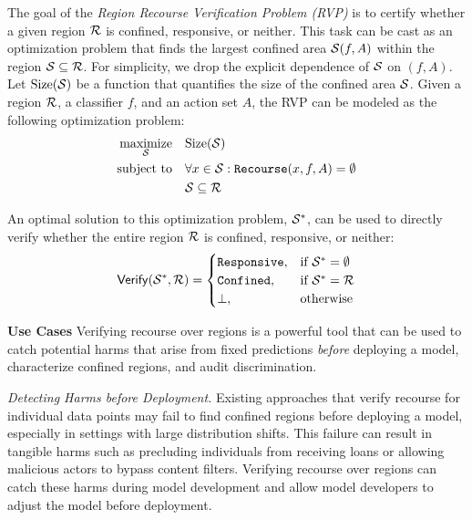 The goal of the \emph{Region Recourse Verification Problem (RVP)} is to certify whether a given region ${\cal R}$ is confined, responsive, or neither. This task can be cast as an optimization problem that finds the largest confined area ${\cal S}(f, A)$ within the region ${\cal S} \subseteq {\cal R}$. For simplicity, we drop the explicit dependence of ${\cal S}$ on $(f, A)$. Let $\text{Size}({\cal S})$ be a function that quantifies the size of the confined area ${\cal S}$. Given a region ${\cal R}$, a classifier $f$, and an action set $A$, the RVP can be modeled as the following optimization problem:
\begin{align*}
\begin{split}
        \mathop{\textup{maximize}}_{{\cal S}}\quad& \text{Size}({\cal S})\\
        \mbox{\textup{subject to}}\quad & \forall x \in {\cal S}: \mathtt{Recourse}(x, f, A)= \emptyset\\
        & {\cal S} \subseteq {\cal R}
\end{split}
\end{align*}

An optimal solution to this optimization problem, ${\cal S}^*$, can be used to directly verify whether the entire region ${\cal R}$ is confined, responsive, or neither:
\begin{align*}
    \Verify{{\cal S}^*}{{\cal R}} = \begin{cases}
        \flagyes, & \textrm{if ${\cal S}^* = \emptyset$} \\
        \flagno,  & \textrm{if ${\cal S}^* = {\cal R}$} \\
        \flagidk{}, & \textrm{otherwise}
    \end{cases}%
\end{align*}


\textbf{Use Cases} Verifying recourse over regions is a powerful tool that can be used to catch potential harms that arise from fixed predictions \emph{before} deploying a model, characterize confined regions, and audit discrimination.

\emph{Detecting Harms before Deployment.} Existing approaches that verify recourse for individual data points may fail to find confined regions before deploying a model, especially in settings with large distribution shifts. This failure can result in tangible harms such as precluding individuals from receiving loans or allowing malicious actors to bypass content filters. Verifying recourse over regions can catch these harms during model development and allow model developers to adjust the model before deployment. 


